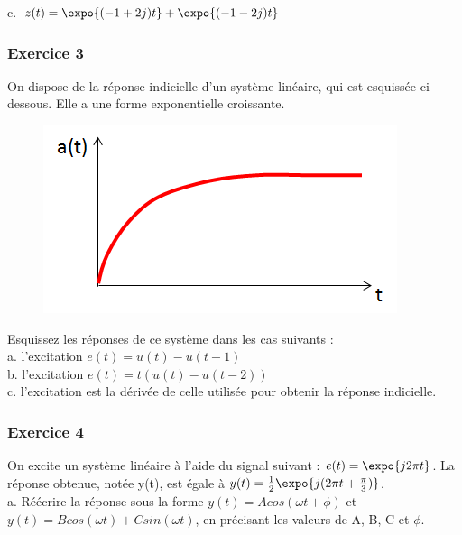 	c. $z(t) = \expo{(-1+2j)t}+\expo{(-1-2j)t}$
	
	\vspace{1\baselineskip}
	
	
	
	\subsubsection{Exercice 3}
	
	On dispose de la réponse indicielle d'un système linéaire, qui est esquissée ci-dessous. Elle a une forme exponentielle croissante.\\
	
	\begin{figure}[htbp]
          \centering \includegraphics[scale=0.5]{images/Exo_2_3.png}
	\end{figure}
	
	Esquissez les réponses de ce système dans les cas suivants :\\
	
	a. l'excitation $e(t)=u(t)-u(t-1)$\\
	
	b. l'excitation $e(t)=t(u(t)-u(t-2))$\\
	
	c. l'excitation est la dérivée de celle utilisée pour obtenir la réponse indicielle.\\
	
	\subsubsection{Exercice 4}
	
	On excite un système linéaire à l'aide du signal suivant : $e(t)=\expo{j2\pi t}$. La réponse obtenue, notée y(t), est égale à $y(t)=\frac{1}{2}\expo{j(2\pi t+\frac{\pi}{3})}$.\\
	
	a. Réécrire la réponse sous la forme $y(t)=Acos(\omega t + \phi)$ et $y(t)=Bcos(\omega t)+Csin(\omega t)$, en précisant les valeurs de A, B, C et $\phi$.\\
	
